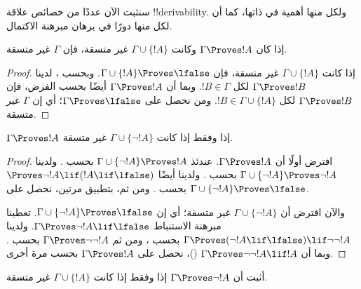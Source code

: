 \documentclass[../../../include/open-logic-section]{subfiles}
\begin{document}
      {}
      {}


سنثبت الآن عددًا من خصائص علاقة !!{derivability}. ولكل منها أهمية في
ذاتها، كما أن لكل منها دورًا في برهان مبرهنة الاكتمال.

\begin{prop}
  إذا كان $\Gamma \Proves !A$ وكانت $\Gamma \cup \{!A\}$ غير متسقة،
  فإن $\Gamma$ غير متسقة.
\end{prop}

\begin{proof}
  إذا كانت $\Gamma \cup \{!A\}$ غير متسقة، فإن $\Gamma \cup \{!A\}
  \Proves \lfalse$. وبحسب ، لدينا $\Gamma
  \Proves !B$ لكل $!B \in \Gamma$. وبما أن $\Gamma \Proves !A$ أيضًا
  بحسب الفرض، فإن $\Gamma \Proves !B$ لكل $!B \in \Gamma \cup
  \{!A\}$. ومن  نحصل على $\Gamma \Proves
  \lfalse$؛ أي إن $\Gamma$ غير متسقة.
\end{proof}

\begin{prop}
$\Gamma \Proves !A$ إذا وفقط إذا كانت $\Gamma \cup \{\lnot !A\}$ غير متسقة.
\end{prop}

\begin{proof}
افترض أولًا أن $\Gamma \Proves !A$. عندئذ $\Gamma \cup \{\lnot !A\}
\Proves !A$ بحسب . ولدينا $\Gamma \cup
\{\lnot !A\} \Proves \lnot !A$ بحسب .
ولدينا أيضًا $\Proves \lnot !A \lif (!A \lif \lfalse)$ بحسب
. ومن ثم، بتطبيق  مرتين، نحصل
على $\Gamma \cup \{\lnot !A\} \Proves \lfalse$.

والآن افترض أن $\Gamma \cup \{\lnot !A\}$ غير متسقة؛ أي إن $\Gamma
\cup \{\lnot !A\} \Proves \lfalse$. تعطينا مبرهنة الاستنباط $\Gamma
\Proves \lnot !A \lif \lfalse$. ولدينا $\Gamma \Proves (\lnot !A
\lif \lfalse) \lif \lnot\lnot !A$ بحسب ، ومن
ثم $\Gamma \Proves \lnot\lnot !A$ بحسب . وبما أن
$\Gamma \Proves \lnot\lnot !A \lif !A$ ()، نحصل
على $\Gamma \Proves !A$ بحسب  مرة أخرى.
\end{proof}

\begin{prob}
أثبت أن $\Gamma \Proves \lnot !A$ إذا وفقط إذا كانت
$\Gamma \cup \{!A\}$ غير متسقة.
\end{prob}
\end{document}
